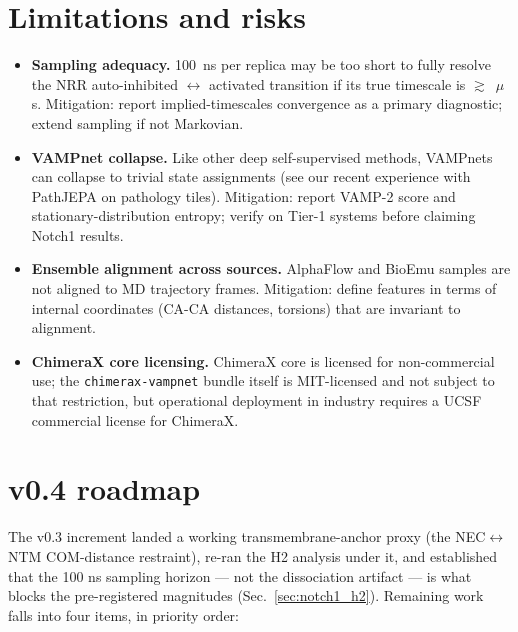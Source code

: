 \documentclass[11pt]{article}
\begin{document}
\section{Limitations and risks}

\begin{itemize}[leftmargin=*,itemsep=2pt]
  \item \textbf{Sampling adequacy.} 100~ns per replica may be too short
        to fully resolve the NRR auto-inhibited $\leftrightarrow$
        activated transition if its true timescale is $\gtrsim$~$\mu$s.
        Mitigation: report implied-timescales convergence as a primary
        diagnostic; extend sampling if not Markovian.
  \item \textbf{VAMPnet collapse.} Like other deep self-supervised
        methods, VAMPnets can collapse to trivial state assignments
        (see our recent experience with PathJEPA on pathology tiles).
        Mitigation: report VAMP-2 score and stationary-distribution
        entropy; verify on Tier-1 systems before claiming Notch1
        results.
  \item \textbf{Ensemble alignment across sources.} AlphaFlow and
        BioEmu samples are not aligned to MD trajectory frames.
        Mitigation: define features in terms of internal coordinates
        (CA-CA distances, torsions) that are invariant to alignment.
  \item \textbf{ChimeraX core licensing.} ChimeraX core is licensed
        for non-commercial use; the \texttt{chimerax-vampnet} bundle
        itself is MIT-licensed and not subject to that restriction,
        but operational deployment in industry requires a UCSF
        commercial license for ChimeraX.
\end{itemize}

\section{v0.4 roadmap}
\label{sec:roadmap}

The v0.3 increment landed a working transmembrane-anchor proxy
(the NEC$\leftrightarrow$NTM COM-distance restraint), re-ran the
H2 analysis under it, and established that the 100 ns sampling
horizon --- not the dissociation artifact --- is what blocks the
pre-registered magnitudes
(Sec.~\ref{sec:notch1_h2}). Remaining work falls into four items,
in priority order:
\end{document}
